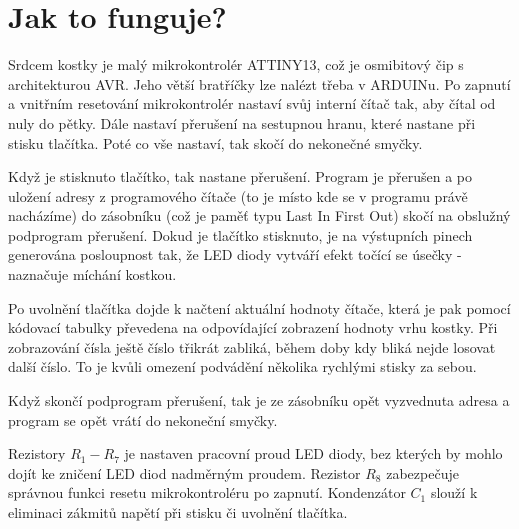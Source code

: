\section*{Jak to funguje?}

Srdcem kostky je malý mikrokontrolér ATTINY13, což je osmibitový čip s architekturou AVR. Jeho větší bratříčky lze nalézt třeba v ARDUINu. Po zapnutí a vnitřním resetování mikrokontrolér nastaví svůj interní čítač tak, aby čítal od nuly do pětky. Dále nastaví přerušení na sestupnou hranu, které nastane při stisku tlačítka. Poté co vše nastaví, tak skočí do nekonečné smyčky.

Když je stisknuto tlačítko, tak nastane přerušení. Program je přerušen a po uložení adresy z programového čítače (to je místo kde se v programu právě nacházíme) do zásobníku (což je paměť typu Last In First Out) skočí na obslužný podprogram přerušení. Dokud je tlačítko stisknuto,  je na výstupních pinech generována posloupnost tak, že LED diody vytváří efekt točící se úsečky - naznačuje míchání kostkou.

Po uvolnění tlačítka dojde k načtení aktuální hodnoty čítače, která je pak pomocí kódovací tabulky převedena na odpovídající zobrazení hodnoty vrhu kostky. Při zobrazování čísla ještě číslo třikrát zabliká, během doby kdy bliká nejde losovat další číslo. To je kvůli omezení podvádění několika rychlými stisky za sebou.

Když skončí podprogram přerušení, tak je ze zásobníku opět vyzvednuta adresa a program se opět vrátí do nekoneční smyčky.

Rezistory $R_1 - R_7$ je nastaven pracovní proud LED diody, bez kterých by mohlo dojít ke zničení LED diod nadměrným proudem. Rezistor $R_8$ zabezpečuje správnou funkci resetu mikrokontroléru po zapnutí. Kondenzátor $C_1$ slouží k eliminaci zákmitů napětí při stisku či uvolnění tlačítka.